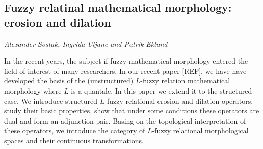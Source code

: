 \documentclass[../booklet.tex]{subfiles}
\begin{document}
\subsection[Fuzzy relatinal mathematical morphology: erosion and dilation. {\it Alexander Sostak, Ingrida Uljane and Patrik Eklund}]{Fuzzy relatinal mathematical morphology: erosion and dilation}
  

\begin{center}
  {\it Alexander Sostak, Ingrida Uljane and Patrik Eklund}
\end{center}


 In the recent years, the subject if fuzzy mathematical morphology entered the field of interest of many researchers. In our recent paper [REF], we have have developed the basis of the (unstructured) $L$-fuzzy relation mathematical morphology where $L$ is a quantale. In this paper we extend  it to the structured case. We introduce structured $L$-fuzzy relational erosion and dilation operators, study their basic properties, show that under some conditions  these operators are dual and form an adjunction pair. Basing on the topological interpretation of these operators, we introduce the category of  $L$-fuzzy relational morphological spaces and their continuous transformations. 


\end{document}
